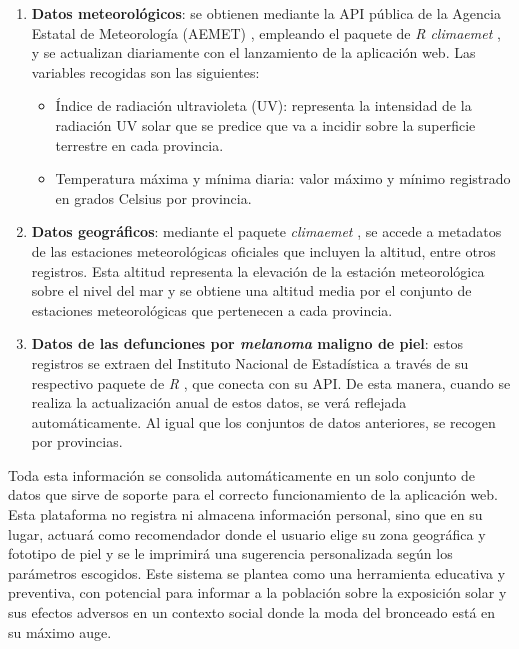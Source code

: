 \begin{enumerate}
    \item \textbf{Datos meteorológicos}: se obtienen mediante la API pública de la Agencia Estatal de Meteorología (AEMET) \cite{AEMETOpenDataa}, empleando el paquete de \textit{R climaemet} \cite{R-climaemet}, y se actualizan diariamente con el lanzamiento de la aplicación web. Las variables recogidas son las siguientes:
    \begin{itemize}
        \item Índice de radiación ultravioleta (UV): representa la intensidad de la radiación UV solar que se predice que va a incidir sobre la superficie terrestre en cada provincia.
        \item Temperatura máxima y mínima diaria: valor máximo y mínimo registrado en grados Celsius por provincia.
    \end{itemize}

    \item \textbf{Datos geográficos}: mediante el paquete \textit{climaemet} \cite{R-climaemet}, se accede a metadatos de las estaciones meteorológicas oficiales que incluyen la altitud, entre otros registros. Esta altitud representa la elevación de la estación meteorológica sobre el nivel del mar y se obtiene una altitud media por el conjunto de estaciones meteorológicas que pertenecen a cada provincia.

    \item \textbf{Datos de las defunciones por \textit{melanoma} maligno de piel}: estos registros se extraen del Instituto Nacional de Estadística a través de su respectivo paquete de \textit{R} \cite{INE_R}, que conecta con su API. De esta manera, cuando se realiza la actualización anual de estos datos, se verá reflejada automáticamente. Al igual que los conjuntos de datos anteriores, se recogen por provincias.
\end{enumerate}

Toda esta información se consolida automáticamente en un solo conjunto de datos que sirve de soporte para el correcto funcionamiento de la aplicación web. Esta plataforma no registra ni almacena información personal, sino que en su lugar, actuará como recomendador donde el usuario elige su zona geográfica y fototipo de piel  y se le imprimirá una sugerencia personalizada según los parámetros escogidos.
Este sistema se plantea como una herramienta educativa y preventiva, con potencial para informar a la población sobre la exposición solar y sus efectos adversos en un contexto social donde la moda del bronceado está en su máximo auge.  

